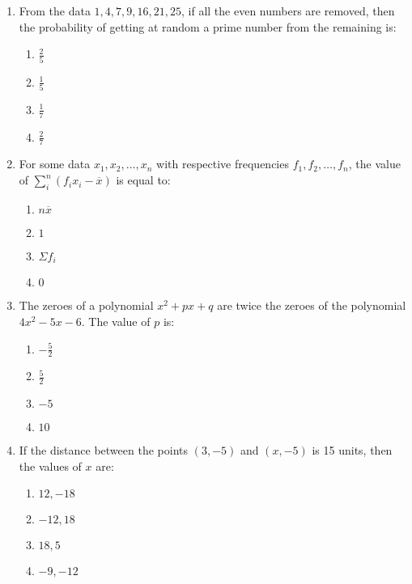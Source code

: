 \documentclass[12pt,-letter paper]{article}
\providecommand{\brak}[1]{\ensuremath{\left(#1\right)}}
\providecommand{\brak}[1]{\ensuremath{\left(#1\right)}}
\begin{document}
\begin{enumerate}
\item From the data $1, 4, 7, 9, 16, 21, 25$, if all the even numbers are removed, then the probability of getting at random a prime number from the remaining is:
	\begin{enumerate}
\item $\frac{2}{5}$
    \item $\frac{1}{5}$
    \item $\frac{1}{7}$
    \item $\frac{2}{7}$
	\end{enumerate}
		\newpage
\item For some data $x_{1}, x_{2}, \dots, x_{n}$ with respective frequencies $f_{1}, f_{2}, \dots, f_{n}$, the value of $\sum_{i}^{n}\brak{ f_{i} x_{i} - \overline{x}}$ is equal to:
	\begin{enumerate}    
\item $n \overline{x}$
    \item $1$
    \item $\Sigma f_{i}$
    \item $0$
	\end{enumerate}
\item The zeroes of a polynomial $x^2 + px + q$ are twice the zeroes of the polynomial $4x^2 - 5x - 6$. The value of $p$ is:
	\begin{enumerate}   
\item $-\frac{5}{2}$
    \item $\frac{5}{2}$
    \item $-5$
    \item $10$
	\end{enumerate}
\item If the distance between the points $(3, -5)$ and $(x, -5)$ is 15 units, then the values of $x$ are:
    \begin{enumerate}
    \item $12, -18$
    \item $-12, 18$
    \item $18, 5$
    \item $-9, -12$
    \end{enumerate}
    

\end{enumerate}
\end{document}
